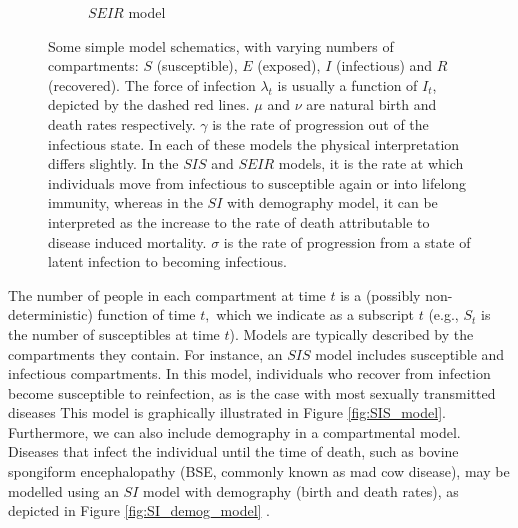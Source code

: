 \begin{figure}[htbp]
\begin{subfigure}[b]{0.45\textwidth}
        \caption{$SEIR$ model}\label{fig:SEIR_model}
    \end{subfigure}%
    \caption{
        Some simple model schematics, with varying numbers of compartments: $S$
        (susceptible), $E$ (exposed), $I$ (infectious) and $R$ (recovered). The
        force of infection $\lambda_t$ is usually a function of $I_t$, depicted
        by the dashed red lines. $\mu$ and $\nu$ are natural birth and death
        rates respectively. $\gamma$ is the rate of progression out of the
        infectious state. In each of these models the physical interpretation
        differs slightly. In the $SIS$ and $SEIR$ models, it is the rate at
        which individuals move from infectious to susceptible again or into
        lifelong immunity, whereas in the $SI$ with demography model, it can be
        interpreted as the increase to the rate of death attributable to
        disease induced mortality. $\sigma$ is the rate of progression from a
        state of latent infection to becoming infectious.
    }\label{fig:simple_models}
\end{figure}

The number of people in each compartment at time $t$ is a (possibly
non-deterministic) function of time $t,$ which we indicate as a subscript $t$
(e.g., $S_t$ is the number of susceptibles at time $t$). Models are typically
described by the compartments they contain. For instance, an $SIS$ model
includes susceptible and infectious compartments. In this model, individuals 
who recover from infection become susceptible to reinfection, as is the case 
with most sexually transmitted diseases \parencite[56]{keeling_modeling_2008} 
This model is graphically illustrated in Figure \ref{fig:SIS_model}.
Furthermore, we can also include demography in a compartmental model. Diseases 
that infect the individual until the time of death, such as bovine spongiform 
encephalopathy (BSE, commonly known as mad cow disease), 
may be modelled using an 
$SI$ model with demography (birth and death rates), as depicted in Figure
\ref{fig:SI_demog_model} \parencite{hagenaars_epidemiological_2006}.

